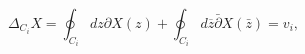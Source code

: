 \begin{equation} 
\label{globmono}
\Delta _{C_{i}}X=\oint _{C_{i}}dz\partial X(z)+\oint
_{C_{i}}d\overline{z}\bar{\partial}X(\bar{z})=v_{i},
\end{equation}

